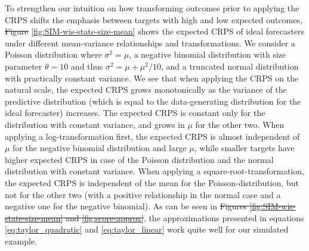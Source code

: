 \documentclass[10pt,letterpaper]{article} %
\providecommand{\DIFaddtex}[1]{{\protect\color{blue}\uwave{#1}}} %
\providecommand{\DIFdeltex}[1]{{\protect\color{red}\sout{#1}}}                      %
\providecommand{\DIFaddbegin}{} %
\providecommand{\DIFaddend}{} %
\providecommand{\DIFdelbegin}{} %
\providecommand{\DIFdelend}{} %
\providecommand{\DIFadd}[1]{\texorpdfstring{\DIFaddtex{#1}}{#1}} %
\providecommand{\DIFdel}[1]{\texorpdfstring{\DIFdeltex{#1}}{}} %
\newcommand{\DIFscaledelfig}{0.5}
\newlength{\DIFdelgraphicswidth} %
\newlength{\DIFdelgraphicsheight} %
\newcommand{\DIFaddincludegraphics}[2][]{{\color{blue}\fbox{\DIFOincludegraphics[#1]{#2}}}} %
\newcommand{\DIFdelincludegraphics}[2][]{%
\sbox{\DIFdelgraphicsbox}{\DIFOincludegraphics[#1]{#2}}%
\settoboxwidth{\DIFdelgraphicswidth}{\DIFdelgraphicsbox} %
\settoboxtotalheight{\DIFdelgraphicsheight}{\DIFdelgraphicsbox} %
\scalebox{\DIFscaledelfig}{%
\parbox[b]{\DIFdelgraphicswidth}{\usebox{\DIFdelgraphicsbox}\\[-\baselineskip] \rule{\DIFdelgraphicswidth}{0em}}\llap{\resizebox{\DIFdelgraphicswidth}{\DIFdelgraphicsheight}{%
\setlength{\unitlength}{\DIFdelgraphicswidth}%
\begin{picture}(1,1)%
\thicklines\linethickness{2pt} %
{\color[rgb]{1,0,0}\put(0,0){\framebox(1,1){}}}%
{\color[rgb]{1,0,0}\put(0,0){\line( 1,1){1}}}%
{\color[rgb]{1,0,0}\put(0,1){\line(1,-1){1}}}%
\end{picture}%
}\hspace*{3pt}}} %
} %
\DeclareRobustCommand{\DIFaddbegin}{\DIFOaddbegin \let\includegraphics\DIFaddincludegraphics} %
\DeclareRobustCommand{\DIFaddend}{\DIFOaddend \let\includegraphics\DIFOincludegraphics} %
\DeclareRobustCommand{\DIFdelbegin}{\DIFOdelbegin \let\includegraphics\DIFdelincludegraphics} %
\DeclareRobustCommand{\DIFdelend}{\DIFOaddend \let\includegraphics\DIFOincludegraphics} %
\begin{document}
To strengthen our intuition on how transforming outcomes prior to applying the CRPS shifts the emphasis between targets with high and low expected outcomes, \DIFdelbegin \DIFdel{Figure }\DIFdelend \DIFaddbegin \DIFadd{Fig }\DIFaddend \ref{fig:SIM-wis-state-size-mean} shows the expected CRPS of ideal forecasters under different mean-variance relationships and transformations. We consider a Poisson distribution where $\sigma^2 = \mu$, a negative binomial distribution with size parameter $\theta = 10$ and thus $\sigma^2 = \mu + \mu^2/10$, and a truncated normal distribution with practically constant variance. We see that when applying the CRPS on the natural scale, the expected CRPS grows monotonically as the variance of the predictive distribution (which is equal to the data-generating distribution for the ideal forecaster) increases. The expected CRPS is constant only for the distribution with constant variance, and grows in $\mu$ for the other two. When applying a log-transformation first, the expected CRPS is almost independent of $\mu$ for the negative binomial distribution and large $\mu$, while smaller targets have higher expected CRPS in case of the Poisson distribution and the normal distribution with constant variance. When applying a square-root-transformation, the expected CRPS is independent of the mean for the Poisson-distribution, but not for the other two (with a positive relationship in the normal case and a negative one for the negative binomial). As can be seen in \DIFdelbegin \DIFdel{Figures \ref{fig:SIM-wis-state-size-mean} and \ref{fig:score-approx}}\DIFdelend \DIFaddbegin \DIFadd{Fig \ref{fig:SIM-wis-state-size-mean} and }\DIFaddend , the approximations presented in equations \eqref{eq:taylor_quadratic} and \eqref{eq:taylor_linear} work quite well for our simulated example. 
\end{document}

